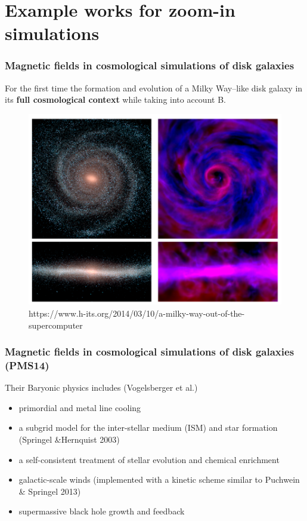 \documentclass[10pt,aspectratio=169]{beamer}
\begin{document}
\section{Example works for zoom-in simulations}
\begin{frame}
	\frametitle{Magnetic fields in cosmological simulations of disk galaxies \citep{2014ApJ...783L..20P}}	
		 For the first time the formation and evolution of a Milky Way–like disk galaxy in its \textbf{full cosmological context} while taking into account B.
		 \begin{figure}
		 	\begin{center}
		 		\includegraphics[width=.45\textwidth]{images/pakmor_apjl_2014/aqmhd.png}
		 		\caption{https://www.h-its.org/2014/03/10/a-milky-way-out-of-the-supercomputer}
		 	\end{center}
		 \end{figure}
\end{frame}
\begin{frame}
	\frametitle{Magnetic fields in cosmological simulations of disk galaxies (PMS14)}
	Their Baryonic physics includes (Vogelsberger et al.)
	\begin{itemize}
		\item primordial and metal line cooling
		\item a subgrid model for the inter-stellar medium (ISM) and star formation (Springel \&Hernquist 2003)
		\item a self-consistent treatment of stellar evolution and chemical enrichment
		\item galactic-scale winds (implemented with a kinetic scheme similar to Puchwein \& Springel 2013)
		\item supermassive black hole growth and feedback
	\end{itemize}	
\end{frame}
\end{document}
